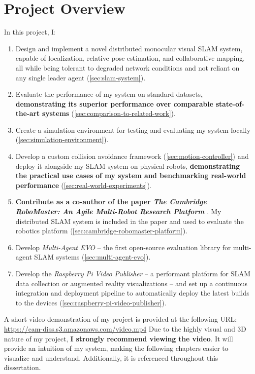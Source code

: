 \section{Project Overview}
\label{sec:project-overview}
In this project, I: \noparskip
{
    \begin{enumerate}
        \item Design and implement a novel distributed monocular visual SLAM system, capable of localization, relative pose estimation, and collaborative mapping, all while being tolerant to degraded network conditions and not reliant on any single leader agent (\autoref{sec:slam-system}).
        \item Evaluate the performance of my system on standard datasets, \textbf{demonstrating its superior performance over comparable state-of-the-art systems} (\autoref{sec:comparison-to-related-work}).
        \item Create a simulation environment for testing and evaluating my system locally (\autoref{sec:simulation-environment}).
        \item Develop a custom collision avoidance framework (\autoref{sec:motion-controller}) and deploy it alongside my SLAM system on physical robots, \textbf{demonstrating the practical use cases of my system and benchmarking real-world performance} (\autoref{sec:real-world-experiments}).
        \item \textbf{Contribute as a co-author of the paper \textit{The Cambridge RoboMaster: An Agile Multi-Robot Research Platform} \autocite{blumenkamp2024cambridge}}. My distributed SLAM system is included in the paper and used to evaluate the robotics platform (\autoref{sec:cambridge-robomaster-platform}).
        \item Develop \textit{Multi-Agent EVO} – the first open-source evaluation library for multi-agent SLAM systems (\autoref{sec:multi-agent-evo}).
        \item Develop the \textit{Raspberry Pi Video Publisher} – a performant platform for SLAM data collection or augmented reality visualizations – and set up a continuous integration and deployment pipeline to automatically deploy the latest builds to the devices (\autoref{sec:raspberry-pi-video-publisher}).
    \end{enumerate}
}

\begin{leftbar}
    A short video demonstration of my project is provided at the following URL:\\ \url{https://cam-diss.s3.amazonaws.com/video.mp4}  \captionbreak Due to the highly visual and 3D nature of my project, \textbf{I strongly recommend viewing the video}. It will provide an intuition of my system, making the following chapters easier to visualize and understand. Additionally, it is referenced throughout this dissertation.
\end{leftbar}

